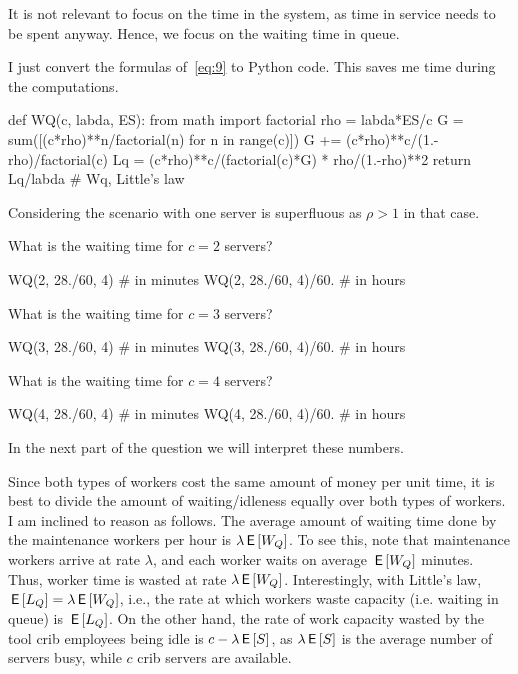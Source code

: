 \begin{exercise}[Hall 5.10]
\begin{solution}
It is not relevant to focus on the time in the system, as time
  in service needs to be spent anyway. Hence, we focus on the waiting
  time in queue.


I just convert the formulas of~\eqref{eq:9} to Python code. This saves
me time during the computations.

\begin{pyconsole}
  
def WQ(c, labda, ES):
    from math import factorial
    rho = labda*ES/c
    G = sum([(c*rho)**n/factorial(n) for n in range(c)])
    G += (c*rho)**c/(1.-rho)/factorial(c)
    Lq = (c*rho)**c/(factorial(c)*G) * rho/(1.-rho)**2
    return Lq/labda # Wq, Little's law

\end{pyconsole} 

Considering the scenario with one server is superfluous as $\rho>1$ in
that case.

What is the waiting time for $c=2$ servers?

\begin{pyconsole}
WQ(2, 28./60, 4) # in minutes
WQ(2, 28./60, 4)/60. # in hours
\end{pyconsole}

What is the waiting time for $c=3$ servers?

\begin{pyconsole}
WQ(3, 28./60, 4)   # in minutes
WQ(3, 28./60, 4)/60. # in hours
\end{pyconsole}


What is the waiting time for $c=4$ servers?

\begin{pyconsole}
WQ(4, 28./60, 4) # in minutes
WQ(4, 28./60, 4)/60. # in hours
\end{pyconsole} 

In the next  part of the question we will interpret these numbers.

Since both types of workers cost the same amount of money per unit
time, it is best to divide the amount of waiting/idleness equally over
both types of workers.  I am inclined to reason as follows. The
average amount of waiting time done by the maintenance workers per
hour is $\lambda \,\mathsf{E}\left[W_Q\right]$. To see this, note that maintenance workers arrive at rate $\lambda$, and each worker waits on average $\,\mathsf{E}\left[W_Q\right]$ minutes. Thus, worker time is wasted at rate $\lambda \,\mathsf{E}\left[W_Q\right]$. Interestingly, with Little's law, $\,\mathsf{E}\left[L_Q\right]=\lambda \,\mathsf{E}\left[W_Q\right]$, i.e., the rate at which workers waste capacity (i.e.  waiting in queue) is $\,\mathsf{E}\left[L_Q\right]$. On the other hand, the  rate of work capacity wasted by the tool crib employees being idle is $c-\lambda \,\mathsf{E}\left[S\right]$, as $\lambda \,\mathsf{E}\left[S\right]$ is the average number of servers busy, while $c$ crib servers are available.


\end{solution}
\end{exercise}
